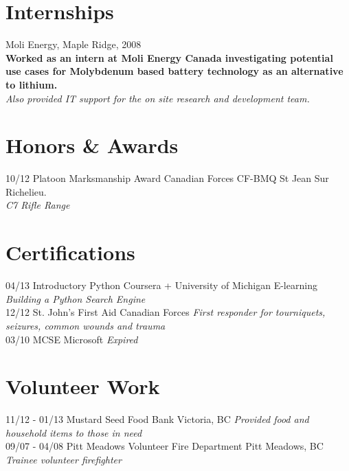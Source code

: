 \documentclass[]{vella-cv}
\begin{document}
\section{Internships}
Moli Energy, Maple Ridge, 2008\\
\textbf{Worked as an intern at Moli Energy Canada investigating potential use cases for Molybdenum based battery technology as an alternative to lithium.}\\
\emph{Also provided IT support for the on site research and development team.}
\\
\section{Honors \& Awards}
\begin{entrylist}
  \entry
    {10/12}
    {Platoon Marksmanship Award}
    {Canadian Forces}
    {CF-BMQ St Jean Sur Richelieu.\\
    \emph{C7 Rifle Range}}
\end{entrylist}

\section{Certifications}
\begin{entrylist}
  \entry
    {04/13}
    {Introductory Python}
    {Coursera + University of Michigan E-learning}
    {\emph{Building a Python Search Engine}}\\
    \entry
    {12/12}
    {St. John's First Aid}
    {Canadian Forces}
    {\emph{First responder for tourniquets, seizures, common wounds and trauma\\}}
    \entry
    {03/10}
    {MCSE}
    {Microsoft}
    {\emph{Expired}}\\
\end{entrylist}
\section{Volunteer Work}
\begin{entrylist}
  \entry
    {11/12 - 01/13}
    {Mustard Seed Food Bank}
    {Victoria, BC}
    {\emph{Provided food and household items to those in need\\}}
    \entry
    {09/07 - 04/08}
    {Pitt Meadows Volunteer Fire Department}
    {Pitt Meadows, BC}
    {\emph{Trainee volunteer firefighter}}

    
\end{entrylist}
\end{document}
